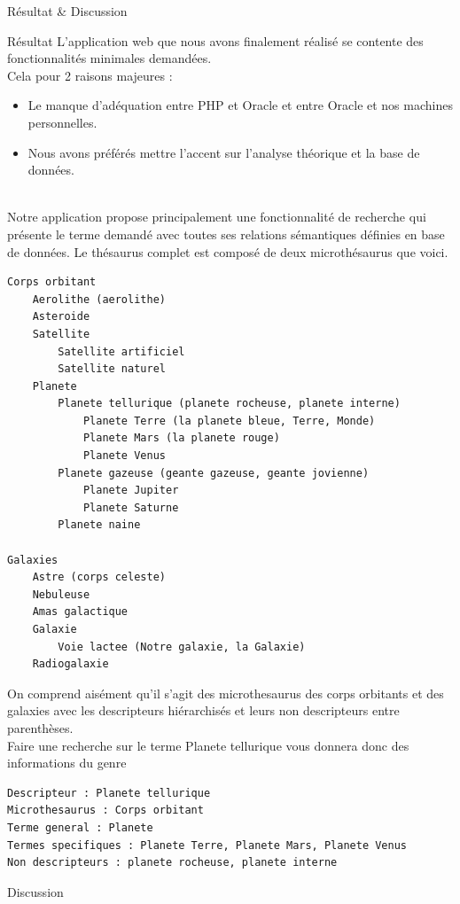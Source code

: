 \documentclass[a4paper, 12pt]{report}
\begin{document}
\begin{chapter}{Résultat \& Discussion}
	\begin{section}{Résultat}
		L'application web que nous avons finalement réalisé se contente des fonctionnalités minimales demandées.\\
		Cela pour 2 raisons majeures :
		\begin{itemize}
			\item Le manque d'adéquation entre PHP et Oracle et entre Oracle et nos machines personnelles.
			\item Nous avons préférés mettre l'accent sur l'analyse théorique et la base de données.
		\end{itemize}~\\
		Notre application propose principalement une fonctionnalité de recherche qui présente le terme demandé avec toutes ses relations sémantiques
		définies en base de données.
		Le thésaurus complet est composé de deux microthésaurus que voici.\\
		\begin{verbatim}
Corps orbitant
	Aerolithe (aerolithe)
	Asteroide
	Satellite 
		Satellite artificiel
		Satellite naturel
	Planete
		Planete tellurique (planete rocheuse, planete interne)
			Planete Terre (la planete bleue, Terre, Monde)
			Planete Mars (la planete rouge)
			Planete Venus
		Planete gazeuse (geante gazeuse, geante jovienne)
			Planete Jupiter
			Planete Saturne
		Planete naine

Galaxies
	Astre (corps celeste)
	Nebuleuse
	Amas galactique
	Galaxie
		Voie lactee (Notre galaxie, la Galaxie)
	Radiogalaxie
	\end{verbatim}
	On comprend aisément qu'il s'agit des microthesaurus des corps orbitants et des galaxies avec les descripteurs hiérarchisés et leurs non descripteurs entre
	parenthèses.\\
	Faire une recherche sur le terme Planete tellurique vous donnera donc des informations du genre\\
	\begin{verbatim}
Descripteur : Planete tellurique
Microthesaurus : Corps orbitant
Terme general : Planete
Termes specifiques : Planete Terre, Planete Mars, Planete Venus
Non descripteurs : planete rocheuse, planete interne
	\end{verbatim}
	\end{section}

	\begin{section}{Discussion}


\end{section}
\end{chapter}
\end{document}

